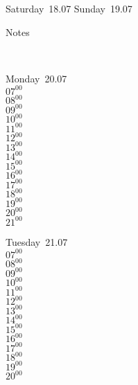\documentclass[11pt,a4paper]{book}\usepackage[]{graphicx}\usepackage[]{color}
\begin{document}
{{%
\begin{tcolorbox}[height=(\textheight-10mm)/6]
Saturday~18.07
\tcblower
Sunday~19.07
\end{tcolorbox} %
%
\begin{tcolorbox}[height=(\textheight-10mm)/6,sidebyside=false]
Notes
\end{tcolorbox}
\clearpage
\vspace{2 mm}\\
%
%
\begin{tcolorbox}
Monday~20.07\\
{ 
$07^{00}$\\
$08^{00}$\\
$09^{00}$\\
$10^{00}$\\
$11^{00}$\\
$12^{00}$\\
$13^{00}$\\
$14^{00}$\\
$15^{00}$\\
$16^{00}$\\
$17^{00}$\\
$18^{00}$\\
$19^{00}$\\
$20^{00}$\\
$21^{00}$}\\
\end{tcolorbox}
%
\begin{tcolorbox}
Tuesday~21.07\\
{ 
$07^{00}$\\
$08^{00}$\\
$09^{00}$\\
$10^{00}$\\
$11^{00}$\\
$12^{00}$\\
$13^{00}$\\
$14^{00}$\\
$15^{00}$\\
$16^{00}$\\
$17^{00}$\\
$18^{00}$\\
$19^{00}$\\
$20^{00}$\\
}
\end{tcolorbox}}}
\end{document}
